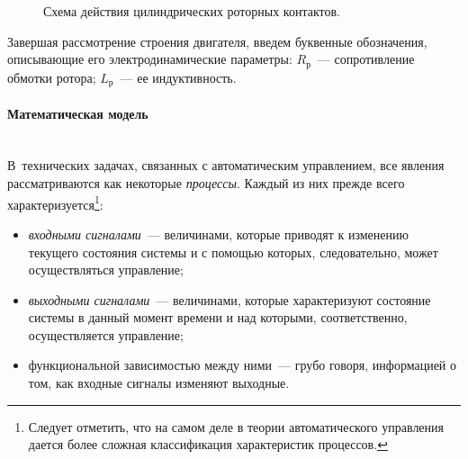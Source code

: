 \documentclass[12pt, a4paper, openany]{extarticle}
\begin{document}
\begin{figure}[h]
\begin{minipage}[h]{0.31\linewidth}
	\end{minipage}
	\hfill
	\begin{minipage}[h]{0.31\linewidth}
	\end{minipage}
	\caption{Схема действия цилиндрических роторных контактов.}
	\label{contacts_in_work}
\end{figure}

Завершая рассмотрение строения двигателя, введем буквенные обозначения, описывающие его электродинамические параметры:
$R_\textit{р}$~--- сопротивление обмотки ротора;  $L_\textit{р}$~--- ее индуктивность.

\paragraph*{Математическая модель}$\phantom{-}$\\
\hspace*{\parindent}В~технических задачах, связанных с автоматическим управлением, все явления рассматриваются как некоторые {\itshape процессы}. 
Каждый из них прежде всего характеризуется\footnote{Следует отметить, что на самом деле в теории автоматического управления дается более сложная классификация характеристик процессов.}:
\begin{itemize}
\item {\itshape входными сигналами}~--- величинами, которые приводят к изменению текущего состояния системы и с помощью которых, следовательно, может осуществляться управление;
\item {\itshape выходными сигналами}~--- величинами, которые характеризуют состояние системы в данный момент времени и над которыми, соответственно, осуществляется управление;
\item функциональной зависимостью между ними~--- грубо говоря, информацией о том, как входные сигналы изменяют выходные.
\end{itemize} 
\end{document}
